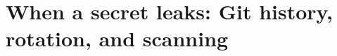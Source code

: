 \chapter{When a secret leaks: Git history, rotation, and scanning}
\label{ch:when-a-secret-leaks-git-history}

